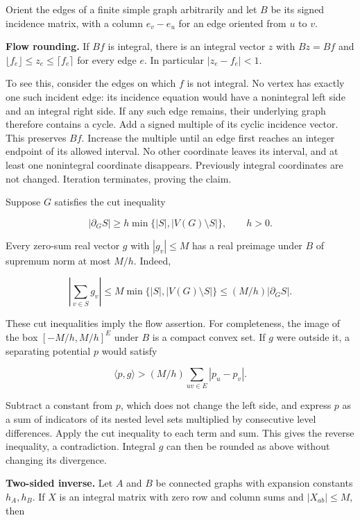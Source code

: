 \documentclass[english,11pt,a4paper]{article}
\begin{document}
Orient the edges of a finite simple graph arbitrarily and let \(B\) be its signed incidence matrix, with a column \(e_{v}-e_{u}\) for an edge oriented from \(u\) to \(v\).

\textbf{Flow rounding.} If \(Bf\) is integral, there is an integral vector \(z\) with \(Bz=Bf\) and \(\lfloor f_e\rfloor\le z_e\le\lceil f_e\rceil\) for every edge \(e\). In particular \(|z_{e}-f_{e}|<1\).

To see this, consider the edges on which \(f\) is not integral. No vertex has exactly one such incident edge: its incidence equation would have a nonintegral left side and an integral right side. If any such edge remains, their underlying graph therefore contains a cycle. Add a signed multiple of its cyclic incidence vector. This preserves \(Bf\). Increase the multiple until an edge first reaches an integer endpoint of its allowed interval. No other coordinate leaves its interval, and at least one nonintegral coordinate disappears. Previously integral coordinates are not changed. Iteration terminates, proving the claim.

Suppose \(G\) satisfies the cut inequality

\[|\partial_G S|\ge h\min\{|S|,|V(G)\setminus S|\},\qquad h>0.\tag{F.1}\]

Every zero-sum real vector \(g\) with \(|g_{v}|\le M\) has a real preimage under \(B\) of supremum norm at most \(M/h\). Indeed,

\[\left|\sum_{v\in S}g_v\right|\le M\min\{|S|,|V(G)\setminus S|\}\le(M/h)|\partial_G S|.\]

These cut inequalities imply the flow assertion. For completeness, the image of the box \([-M/h,M/h]^E\) under \(B\) is a compact convex set. If \(g\) were outside it, a separating potential \(p\) would satisfy

\[\langle p,g\rangle>(M/h)\sum_{uv\in E}|p_u-p_v|.\]

Subtract a constant from \(p\), which does not change the left side, and express \(p\) as a sum of indicators of its nested level sets multiplied by consecutive level differences. Apply the cut inequality to each term and sum. This gives the reverse inequality, a contradiction. Integral \(g\) can then be rounded as above without changing its divergence.

\textbf{Two-sided inverse.} Let \(A\) and \(B\) be connected graphs with expansion constants \(h_{A},h_{B}\). If \(X\) is an integral matrix with zero row and column sums and \(|X_{ab}|\le M\), then
\end{document}
